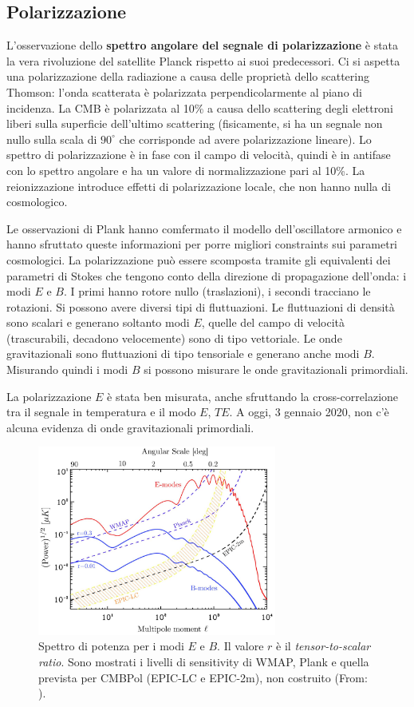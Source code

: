 \subsection{Polarizzazione}
L'osservazione dello \textbf{spettro angolare del segnale di polarizzazione} è stata la vera rivoluzione del satellite Planck rispetto ai suoi predecessori. Ci si aspetta una polarizzazione della radiazione a causa delle proprietà dello scattering Thomson: l'onda scatterata è polarizzata perpendicolarmente al piano di incidenza. La CMB è polarizzata al 10\% a causa dello scattering degli elettroni liberi sulla superficie dell'ultimo scattering (fisicamente, si ha un segnale non nullo sulla scala di $90^\circ$ che corrisponde ad avere polarizzazione lineare). Lo spettro di polarizzazione è in fase con il campo di velocità, quindi è in antifase con lo spettro angolare e ha un valore di normalizzazione pari al 10\%. La reionizzazione introduce effetti di polarizzazione locale, che non hanno nulla di cosmologico. 

Le osservazioni di Plank hanno comfermato il modello dell'oscillatore armonico e hanno sfruttato queste informazioni per porre migliori constraints sui parametri cosmologici. La polarizzazione può essere scomposta tramite gli equivalenti dei parametri di Stokes che tengono conto della direzione di propagazione dell'onda: i modi $E$ e $B$. I primi hanno rotore nullo (traslazioni), i secondi tracciano le rotazioni. Si possono avere diversi tipi di fluttuazioni. Le fluttuazioni di densità sono scalari e generano soltanto modi $E$, quelle del campo di velocità (trascurabili, decadono  velocemente) sono di tipo vettoriale. Le onde gravitazionali sono fluttuazioni di tipo tensoriale e generano anche modi $B$. Misurando quindi i modi $B$ si possono misurare le onde gravitazionali primordiali. 

La polarizzazione $E$ è stata ben misurata, anche sfruttando la cross-correlazione tra il segnale in temperatura e il modo $E$, $TE$. A oggi, 3 gennaio 2020, non c'è alcuna evidenza di onde gravitazionali primordiali. 


\begin{figure}[ht]
    \centering
    \includegraphics[width=0.7\textwidth]{Pictures/11/eb.jpg}
    \caption{Spettro di potenza per i modi $E$ e $B$. Il valore $r$ è il \textit{tensor-to-scalar ratio}. Sono mostrati i livelli di sensitivity di WMAP, Plank e quella prevista per CMBPol (EPIC-LC e EPIC-2m), non costruito (From: \cite{Baumann_2009}).}
\end{figure}

